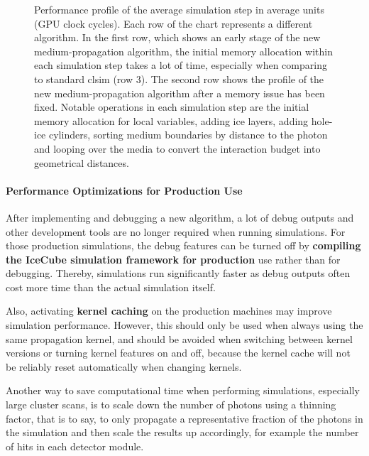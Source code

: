 
\begin{figure}[htbp]
  \caption{Performance profile of the average simulation step in average units (GPU clock cycles). Each row of the chart represents a different algorithm. In the first row, which shows an early stage of the new medium-propagation algorithm, the initial memory allocation within each simulation step takes a lot of time, especially when comparing to standard clsim (row 3). The second row shows the profile of the new medium-propagation algorithm after a memory issue has been fixed. Notable operations in each simulation step are the initial memory allocation for local variables, adding ice layers, adding hole-ice cylinders, sorting medium boundaries by distance to the photon and looping over the media to convert the interaction budget into geometrical distances.}
  \label{fig:profiling-paz4Eig6}
\end{figure}


\paragraph{Performance Optimizations for Production Use}
After implementing and debugging a new algorithm, a lot of debug outputs and other development tools are no longer required when running simulations. For those production simulations, the debug features can be turned off by \textbf{compiling the IceCube simulation framework for production} use rather than for debugging. Thereby, simulations run significantly faster as debug outputs often cost more time than the actual simulation itself.


Also, activating \textbf{kernel caching} on the production machines may improve simulation performance. However, this should only be used when always using the same propagation kernel, and should be avoided when switching between kernel versions or turning kernel features on and off, because the kernel cache will not be reliably reset automatically when changing kernels.


Another way to save computational time when performing simulations, especially large cluster scans, is to scale down the number of photons using a thinning factor, that is to say, to only propagate a representative fraction of the photons in the simulation and then scale the results up accordingly, for example the number of hits in each detector module.

